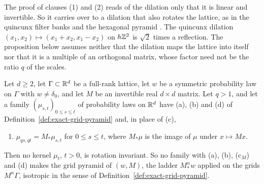 The proof of clauses (1) and (2) reads of the dilation only that it is linear and invertible. So it
carries over to a dilation that also rotates the lattice, as in the quincunx filter banks
\cite[(2), p.~534]{kovacevic1992nonseparable} and the hexagonal pyramid
\cite[pp.~97, 99]{watson1989hexagonal}. The quincunx dilation $(x_1, x_2) \mapsto
(x_1 + x_2, x_1 - x_2)$ on $h\mathbb{Z}^2$ is $\sqrt2$ times a reflection. The proposition below assumes
neither that the dilation maps the lattice into itself nor that it is a multiple of an orthogonal
matrix, whose factor need not be the ratio $q$ of the scales.

\begin{proposition}
\label{prop:expanding-grid-pyramid-not-isotropic}

Let $d \ge 2$, let $\Gamma \subset \mathbb{R}^d$ be a full-rank lattice, let $w$ be a symmetric
probability law on $\Gamma$ with $w \ne \delta_0$, and let $M$ be an invertible real $d \times d$
matrix. Let $q > 1$, and let a family $(\mu_{s,t})_{0 \le s \le t}$ of probability laws on
$\mathbb{R}^d$ have (a), (b) and (d) of Definition~\ref{def:exact-grid-pyramid} and, in place of (c),
\begin{enumerate}
\item[(c$_M$)] $\mu_{qs,qt} = M_*\mu_{s,t}$ for $0 \le s \le t$, where $M_*\mu$ is the image of
$\mu$ under $x \mapsto Mx$.
\end{enumerate}
Then no kernel $\mu_t$, $t > 0$, is rotation invariant. So no family with (a), (b), (c$_M$) and (d) makes the grid pyramid of $(w, M)$, the ladder $M^n_*w$ applied on the grids $M^n\Gamma$, isotropic in the sense of Definition~\ref{def:exact-grid-pyramid}.
\end{proposition}

